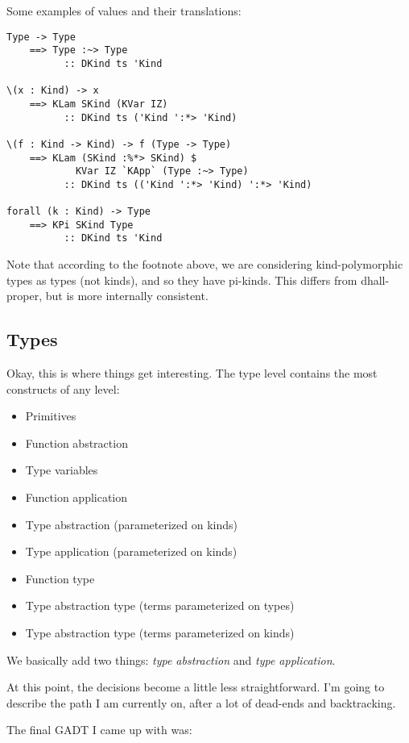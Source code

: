 \documentclass[]{article}
\begin{document}
Some examples of values and their translations:

\begin{verbatim}
Type -> Type
    ==> Type :~> Type
          :: DKind ts 'Kind

\(x : Kind) -> x
    ==> KLam SKind (KVar IZ)
          :: DKind ts ('Kind ':*> 'Kind)

\(f : Kind -> Kind) -> f (Type -> Type)
    ==> KLam (SKind :%*> SKind) $
            KVar IZ `KApp` (Type :~> Type)
          :: DKind ts (('Kind ':*> 'Kind) ':*> 'Kind)

forall (k : Kind) -> Type
    ==> KPi SKind Type
          :: DKind ts 'Kind
\end{verbatim}

Note that according to the footnote above, we are considering kind-polymorphic
types as types (not kinds), and so they have pi-kinds. This differs from
dhall-proper, but is more internally consistent.

\hypertarget{types}{%
\subsection{Types}\label{types}}

Okay, this is where things get interesting. The type level contains the most
constructs of any level:

\begin{itemize}
\tightlist
\item
  Primitives
\item
  Function abstraction
\item
  Type variables
\item
  Function application
\item
  Type abstraction (parameterized on kinds)
\item
  Type application (parameterized on kinds)
\item
  Function type
\item
  Type abstraction type (terms parameterized on types)
\item
  Type abstraction type (terms parameterized on kinds)
\end{itemize}

We basically add two things: \emph{type abstraction} and \emph{type
application}.

At this point, the decisions become a little less straightforward. I'm going to
describe the path I am currently on, after a lot of dead-ends and backtracking.

The final GADT I came up with was:
\end{document}
